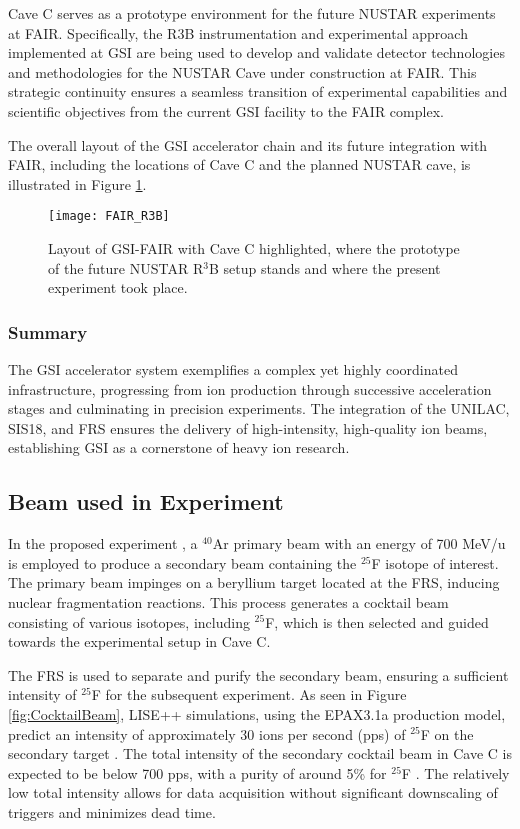 Cave C serves as a prototype environment for the future NUSTAR experiments at \gls{FAIR}. Specifically, the \gls{R3B} instrumentation and experimental approach implemented at GSI are being used to develop and validate detector technologies and methodologies for the NUSTAR Cave under construction at \gls{FAIR}. This strategic continuity ensures a seamless transition of experimental capabilities and scientific objectives from the current GSI facility to the \gls{FAIR} complex.

The overall layout of the GSI accelerator chain and its future integration with FAIR, including the locations of Cave C and the planned NUSTAR cave, is illustrated in Figure \ref{fig:GSI_FAIR_R3B}.

\begin{figure}
	\centering
	\texttt{[image: FAIR\_R3B]}
	\caption{Layout of GSI-FAIR with Cave C highlighted, where the prototype of the future NUSTAR R$^3$B setup stands and where the present experiment took place.}
	\label{fig:GSI_FAIR_R3B}
\end{figure}


\subsubsection{Summary}

The GSI accelerator system exemplifies a complex yet highly coordinated infrastructure, progressing from ion production through successive acceleration stages and culminating in precision experiments. The integration of the UNILAC, SIS18, and \gls{FRS} ensures the delivery of high-intensity, high-quality ion beams, establishing GSI as a cornerstone of heavy ion research.



\subsection{Beam used in Experiment}

In the proposed experiment \cite{panin2024neutron}, a $^{40}$Ar primary beam with an energy of 700 MeV/u is employed to produce a secondary beam containing the $^{25}$F isotope of interest. The primary beam impinges on a beryllium target located at the \gls{FRS}, inducing nuclear fragmentation reactions. This process generates a cocktail beam consisting of various isotopes, including $^{25}$F, which is then selected and guided towards the experimental setup in Cave C.

The \gls{FRS} is used to separate and purify the secondary beam, ensuring a sufficient intensity of $^{25}$F for the subsequent experiment. As seen in Figure \ref{fig:CocktailBeam}, LISE++ simulations, using the EPAX3.1a production model, predict an intensity of approximately 30 ions per second (pps) of $^{25}$F on the secondary target \cite{panin2024neutron}. The total intensity of the secondary cocktail beam in Cave C is expected to be below 700 pps, with a purity of around 5\% for $^{25}$F \cite{panin2024neutron}. The relatively low total intensity allows for data acquisition without significant downscaling of triggers and minimizes dead time.

